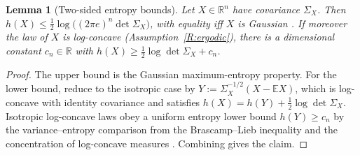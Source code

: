 \documentclass[11pt]{article}
\theoremstyle{plain}
\newtheorem{lemma}[theorem]{Lemma}
\theoremstyle{definition}
\theoremstyle{remark}
\newcommand{\R}{\mathbb{R}}
\newcommand{\E}{\mathbb{E}}
\begin{document}
\begin{lemma}[Two-sided entropy bounds]\label{lem:entropy}
Let $X\in\R^n$ have covariance $\Sigma_X$. Then $h(X)\le\tfrac12\log\!\big((2\pi e)^n\det\Sigma_X\big)$, with equality iff $X$ is Gaussian \citep[Thm.~8.6.5]{coverthomas2006}. If moreover the law of $X$ is log-concave (Assumption~\ref{R:ergodic}), there is a dimensional constant $c_n\in\R$ with $h(X)\ge\tfrac12\log\det\Sigma_X+c_n$.
\end{lemma}
\begin{proof}
The upper bound is the Gaussian maximum-entropy property. For the lower bound, reduce to the isotropic case by $Y:=\Sigma_X^{-1/2}(X-\E X)$, which is log-concave with identity covariance and satisfies $h(X)=h(Y)+\tfrac12\log\det\Sigma_X$. Isotropic log-concave laws obey a uniform entropy lower bound $h(Y)\ge c_n$ by the variance--entropy comparison from the Brascamp--Lieb inequality and the concentration of log-concave measures \citep{brascamplieb1976,bobkov2003}. Combining gives the claim.
\end{proof}
\end{document}

